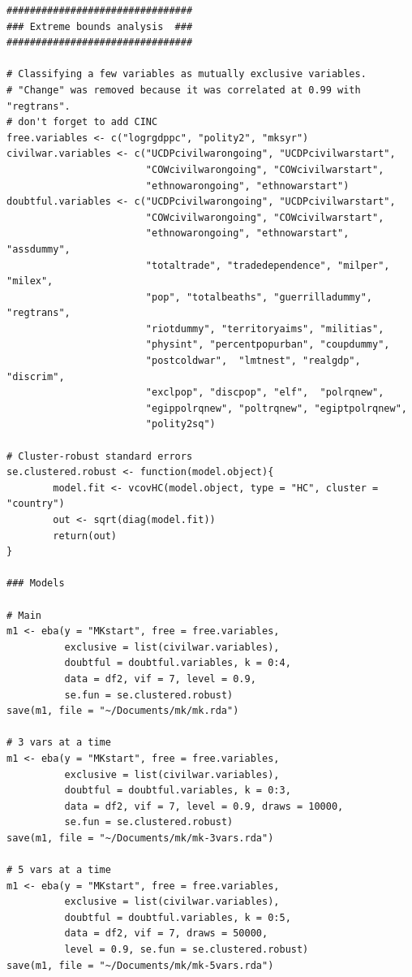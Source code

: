 \begin{verbatim}
################################
### Extreme bounds analysis  ###
################################

# Classifying a few variables as mutually exclusive variables.
# "Change" was removed because it was correlated at 0.99 with "regtrans". 
# don't forget to add CINC
free.variables <- c("logrgdppc", "polity2", "mksyr")
civilwar.variables <- c("UCDPcivilwarongoing", "UCDPcivilwarstart",
                        "COWcivilwarongoing", "COWcivilwarstart",
                        "ethnowarongoing", "ethnowarstart")
doubtful.variables <- c("UCDPcivilwarongoing", "UCDPcivilwarstart",
                        "COWcivilwarongoing", "COWcivilwarstart",
                        "ethnowarongoing", "ethnowarstart", "assdummy",
                        "totaltrade", "tradedependence", "milper", "milex",
                        "pop", "totalbeaths", "guerrilladummy", "regtrans",
                        "riotdummy", "territoryaims", "militias",
                        "physint", "percentpopurban", "coupdummy",
                        "postcoldwar",  "lmtnest", "realgdp", "discrim",
                        "exclpop", "discpop", "elf",  "polrqnew",
                        "egippolrqnew", "poltrqnew", "egiptpolrqnew",
                        "polity2sq")

# Cluster-robust standard errors
se.clustered.robust <- function(model.object){
        model.fit <- vcovHC(model.object, type = "HC", cluster = "country")
        out <- sqrt(diag(model.fit))
        return(out)
}

### Models

# Main
m1 <- eba(y = "MKstart", free = free.variables,
          exclusive = list(civilwar.variables),
          doubtful = doubtful.variables, k = 0:4,
          data = df2, vif = 7, level = 0.9,
          se.fun = se.clustered.robust)
save(m1, file = "~/Documents/mk/mk.rda")

# 3 vars at a time
m1 <- eba(y = "MKstart", free = free.variables,
          exclusive = list(civilwar.variables),
          doubtful = doubtful.variables, k = 0:3,
          data = df2, vif = 7, level = 0.9, draws = 10000,
          se.fun = se.clustered.robust)
save(m1, file = "~/Documents/mk/mk-3vars.rda")

# 5 vars at a time
m1 <- eba(y = "MKstart", free = free.variables,
          exclusive = list(civilwar.variables),
          doubtful = doubtful.variables, k = 0:5,
          data = df2, vif = 7, draws = 50000,
          level = 0.9, se.fun = se.clustered.robust)
save(m1, file = "~/Documents/mk/mk-5vars.rda")


\end{verbatim}
